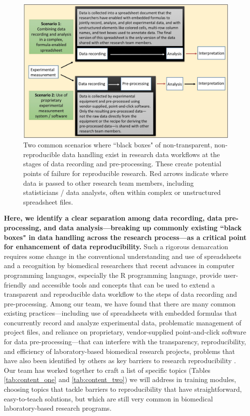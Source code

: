 \documentclass[pdftex,english,11.5pt,parskip=half]{scrartcl}
\begin{document}
\begin{figure}[h] 
\centering
\includegraphics[width = \textwidth]{figures/existing_blackboxes.jpg} 
\caption{Two common scenarios where ``black boxes" of non-transparent, non-reproducible data handling exist in research data workflows at the stages of data recording and pre-processing. These create potential
points of failure for reproducible research. Red arrows indicate where data is passed to other research team members, including statisticians / data analysts, often within complex or unstructured spreadsheet files.} 
\label{fig:workflow} \end{figure}

\textbf{Here, we identify a clear separation among data recording, data pre-processing, and
data analysis---breaking up commonly existing ``black boxes" in data handling across the research process---as a critical point for enhancement of data reproducibility.} Such a rigorous demarcation 
requires some change in the conventional understanding and use of spreadsheets and a recognition by 
biomedical researchers that recent advances in computer programming languages, especially the 
R programming language, provide user-friendly and accessible tools and concepts that can be 
used to extend a transparent and reproducible data workflow to the steps of data recording and pre-processing. 
Among our team, we have
found that there are many common existing practices---including use of
spreadsheets with embedded formulas that concurrently record and analyze
experimental data, problematic management of project files,
and reliance on proprietary, vendor-supplied point-and-click software for data
pre-processing---that can interfere with the transparency, reproducibility, and
efficiency of laboratory-based biomedical research projects, problems that have also been
identified by others as key barriers to research reproducibility 
\cite{broman2018data, bryan2018excuse, ellis2018share, marwick2018packaging}.
Our team has worked together to craft a list of
specific topics (Tables \ref*{tab:content_one} and \ref*{tab:content_two}) we will address in training modules, choosing topics that tackle barriers to reproducibility that have
straightforward, easy-to-teach solutions, but which are still very common in
biomedical laboratory-based research programs.
\end{document}

